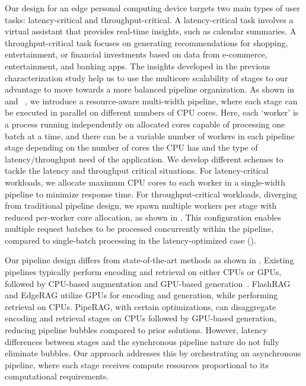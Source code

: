 Our design for an edge personal computing device targets two main types of user tasks: latency-critical and throughput-critical. A latency-critical task involves a virtual assistant that provides real-time insights, such as calendar summaries. A throughput-critical task focuses on generating recommendations for shopping, entertainment, or financial investments based on data from e-commerce, entertainment, and banking apps.
The insights developed in the previous characterization study help us to use the multicore scalability of stages to our advantage to move towards a more balanced pipeline organization. As shown in  and ~, we introduce a resource-aware multi-width pipeline, where each stage can be executed in parallel on different numbers of CPU cores. Here, each `worker' is a process running independently on allocated cores capable of processing one batch at a time, and there can be a variable number of workers in each pipeline stage depending on the number of cores the CPU has and the type of latency/throughput need of the application. We develop different schemes to tackle the latency and throughput critical situations. For latency-critical workloads, we allocate maximum CPU cores to each worker in a single-width pipeline to minimize response time. For throughput-critical workloads, diverging from traditional pipeline design, we spawn multiple workers per stage with reduced per-worker core allocation, as shown in . This configuration enables multiple request batches to be processed concurrently within the pipeline, compared to single-batch processing in the latency-optimized case ().

Our pipeline design differs from state-of-the-art methods as shown in . Existing pipelines typically perform encoding and retrieval on either CPUs or GPUs, followed by CPU-based augmentation and GPU-based generation~\cite{jin2024flashrag, jiang2024piperag, EdgeRAG}. FlashRAG and EdgeRAG utilize GPUs for encoding and generation, while performing retrieval on CPUs. PipeRAG, with certain optimizations, can disaggregate encoding and retrieval stages on CPUs followed by GPU-based generation, reducing pipeline bubbles compared to prior solutions. However, latency differences between stages and the synchronous pipeline nature do not fully eliminate bubbles. Our approach addresses this by orchestrating an asynchronous pipeline, where each stage receives compute resources proportional to its computational requirements.

